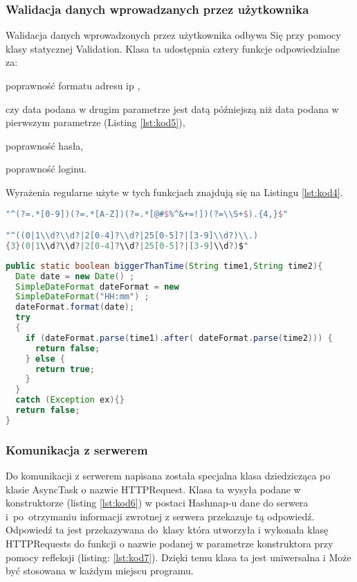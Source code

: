 \documentclass[twoside,10pt]{article}
\begin{document}
\subsubsection{Walidacja danych wprowadzanych przez użytkownika}
Walidacja danych wprowadzonych przez użytkownika odbywa Się przy pomocy klasy statycznej Validation. Klasa ta udostępnia cztery funkcje odpowiedzialne za:
\begin{itemize*}
\item poprawność formatu adresu ip ,
\item czy data podana w drugim parametrze jest datą późniejszą niż data podana w pierwszym parametrze (Listing \ref{lst:kod5}),
\item poprawność hasła,
\item poprawność loginu.
\end{itemize*}

Wyrażenia regularne użyte w tych funkcjach znajdują się na Listingu \ref{lst:kod4}.

\begin{lstlisting}[caption={Wyrażenia regularne.}, label={lst:kod4}, language=Kotlin]
"^(?=.*[0-9])(?=.*[A-Z])(?=.*[@#$%^&+=!])(?=\\S+$).{4,}$"

"^((0|1\\d?\\d?|2[0-4]?\\d?|25[0-5]?|[3-9]\\d?)\\.)
{3}(0|1\\d?\\d?|2[0-4]?\\d?|25[0-5]?|[3-9]\\d?)$"
\end{lstlisting}

\begin{lstlisting}[caption={Funkcja odpowiedzialna za sprawdzanie, która data jest pó"zniejsza.}, label={lst:kod5}, language=Java]
public static boolean biggerThanTime(String time1,String time2){
  Date date = new Date() ;
  SimpleDateFormat dateFormat = new 
  SimpleDateFormat("HH:mm") ;
  dateFormat.format(date);
  try 
  {
    if (dateFormat.parse(time1).after( dateFormat.parse(time2))) {
      return false;
    } else {
      return true;
    }
  }
  catch (Exception ex){}
  return false;
}
\end{lstlisting}

\subsubsection{Komunikacja z serwerem}
Do komunikacji z serwerem napisana została specjalna klasa dziedzicząca po klasie AsyncTask o nazwie HTTPRequest. Klasa ta wysyła podane w konstruktorze (listing \ref{lst:kod6}) w postaci Hashmap-u dane do serwera i~po~otrzymaniu informacji zwrotnej z serwera przekazuje tą odpowiedź. Odpowiedź ta jest przekazywana do~klasy która utworzyła i wykonała klasę HTTPRequests do funkcji o nazwie podanej w parametrze konstruktora przy pomocy refleksji (listing: \ref{lst:kod7}). Dzięki temu klasa ta jest uniwersalna i Może być stosowana w każdym miejscu programu.
\end{document}
